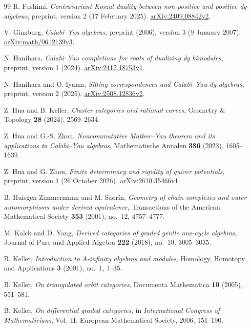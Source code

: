 \documentclass[12pt,a4paper,english,reqno]{amsart}
\theoremstyle{plain}
\theoremstyle{definition}
\numberwithin{equation}{section}
\begin{document}
\begin{thebibliography}{99}
R. Fushimi, \emph{Contravariant Koszul duality between non-positive and positive dg algebras}, preprint, version 2 (17 February 2025). \href{https://arxiv.org/abs/2409.08842v2}{arXiv:2409.08842v2}. 

V. Ginzburg, \emph{Calabi--Yau algebras}, preprint (2006), version 3 (9 January 2007). \href{https://arxiv.org/abs/math/0612139v3}{arXiv:math/0612139v3}. 

N. Hanihara, \emph{Calabi--Yau completions for roots of dualizing dg bimodules}, preprint, version 1 (2024). \href{https://arxiv.org/abs/2412.18753v1}{arXiv:2412.18753v1}.

N. Hanihara and O. Iyama, \emph{Silting correspondences and Calabi--Yau dg algebras}, preprint, version 2 (2025). \href{https://arxiv.org/abs/2508.12836v2}{arXiv:2508.12836v2}. 

Z. Hua and B. Keller, \emph{Cluster categories and rational curves}, Geometry \& Topology \textbf{28} (2024), 2569--2634. 

Z. Hua and G.-S. Zhou, \emph{Noncommutative Mather--Yau theorem and its applications to Calabi--Yau algebras}, Mathematische Annalen \textbf{386} (2023), 1605--1639. 

Z. Hua and G. Zhou, \emph{Finite determinacy and rigidity of quiver potentials}, preprint, version 1 (26 October 2026). \href{https://arxiv.org/abs/2610.35466v1}{arXiv:2610.35466v1}. 

B. Huisgen-Zimmermann and M. Saor\'in, \emph{Geometry of chain complexes and outer automorphisms under derived equivalence}, Transactions of the American Mathematical Society \textbf{353} (2001), no.~12, 4757--4777. 


M. Kalck and D. Yang, \emph{Derived categories of graded gentle one-cycle algebras}, Journal of Pure and Applied Algebra \textbf{222} (2018), no.~10, 3005--3035. 

B. Keller, \emph{Introduction to $A$-infinity algebras and modules}, Homology, Homotopy and Applications \textbf{3} (2001), no.~1, 1--35.

B. Keller, \emph{On triangulated orbit categories}, Documenta Mathematica \textbf{10} (2005), 551--581. 

B. Keller, \emph{On differential graded categories}, in \emph{International Congress of Mathematicians}, Vol.~II, European Mathematical Society, 2006, 151--190.


\end{thebibliography}
\end{document}
